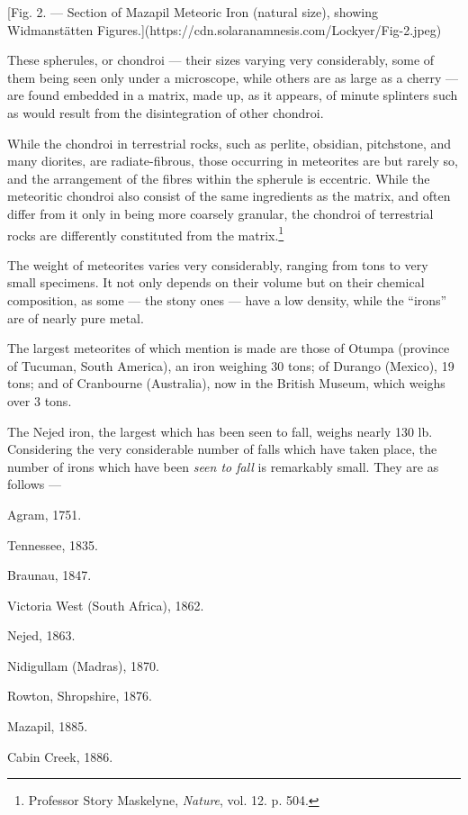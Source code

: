 \documentclass[a4paper, 12pt, oneside, polutonikogreek, english]{article}
\begin{document}
[Fig. 2. --- Section of Mazapil Meteoric Iron (natural size), showing Widmanstätten Figures.](https://cdn.solaranamnesis.com/Lockyer/Fig-2.jpeg)

These spherules, or chondroi --- their sizes varying very considerably, some of them being seen only under a microscope, while others are as large as a cherry --- are found embedded in a matrix, made up, as it appears, of minute splinters such as would result from the disintegration of other chondroi.

While the chondroi in terrestrial rocks, such as perlite, obsidian, pitchstone, and many diorites, are radiate-fibrous, those occurring in meteorites are but rarely so, and the arrangement of the fibres within the spherule is eccentric. While the meteoritic chondroi also consist of the same ingredients as the matrix, and often differ from it only in being more coarsely granular, the chondroi of terrestrial rocks are differently constituted from the matrix.\footnote{Professor Story Maskelyne, \emph{Nature}, vol. 12. p. 504.}

The weight of meteorites varies very considerably, ranging from tons to very small specimens. It not only depends on their volume but on their chemical composition, as some --- the stony ones --- have a low density, while the ``irons'' are of nearly pure metal.

The largest meteorites of which mention is made are those of Otumpa (province of Tucuman, South America), an iron weighing 30 tons; of Durango (Mexico), 19 tons; and of Cranbourne (Australia), now in the British Museum, which weighs over 3 tons.

The Nejed iron, the largest which has been seen to fall, weighs nearly 130 lb. Considering the very considerable number of falls which have taken place, the number of irons which have been \emph{seen to fall} is remarkably small. They are as follows ---

Agram, 1751.

Tennessee, 1835.

Braunau, 1847.

Victoria West (South Africa), 1862.

Nejed, 1863.

Nidigullam (Madras), 1870.

Rowton, Shropshire, 1876.

Mazapil, 1885.

Cabin Creek, 1886.
\end{document}
